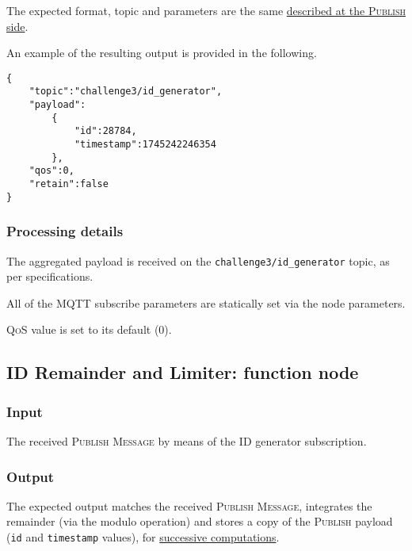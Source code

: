 \documentclass[a4paper,11pt]{article} %
\begin{document}
    The expected format, topic and parameters are the same \hyperref[sec:id-generator-publisher]{described at the \textsc{Publish} side}.

    \medskip

    An example of the resulting output is provided in the following.

    \begin{verbatim}
{
    "topic":"challenge3/id_generator",
    "payload":
        {
            "id":28784,
            "timestamp":1745242246354
        },
    "qos":0,
    "retain":false
}
    \end{verbatim}

    \subsubsection{Processing details}

    The aggregated payload is received on the \texttt{challenge3/id\_generator} topic, as per specifications.

    \smallskip

    All of the MQTT subscribe parameters are statically set via the node parameters.

    \smallskip

    \textsc{QoS} value is set to its default (\textsc{0}).

    \subsection{ID Remainder and Limiter: function node}\label{subsec:id-remainder-and-limiter:-function-node}

    \subsubsection{Input}

    The received \textsc{Publish Message} by means of the ID generator subscription.

    \subsubsection{Output}

    The expected output matches the received \textsc{Publish Message}, integrates the remainder (via the modulo operation) and stores a copy of the \textsc{Publish} payload (\texttt{id} and \texttt{timestamp} values), for \hyperref[subsec:check-and-prepare:-function-node]{successive computations}.
\end{document}

